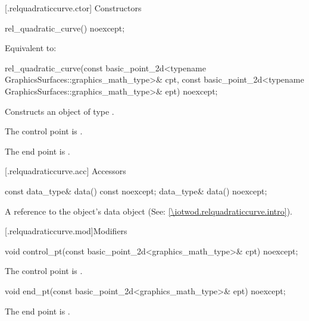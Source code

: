  [\iotwod.relquadraticcurve.ctor] {Constructors}%

%
\begin{itemdecl}
rel_quadratic_curve() noexcept;
\end{itemdecl}
\begin{itemdescr}
\pnum
\effects Equivalent to: 
\end{itemdescr}

%
\begin{itemdecl}
rel_quadratic_curve(const basic_point_2d<typename GraphicsSurfaces::graphics_math_type>& cpt,
  const basic_point_2d<typename GraphicsSurfaces::graphics_math_type>& ept) noexcept;
\end{itemdecl}
\begin{itemdescr}
\pnum
\effects Constructs an object of type .

\pnum
\remarks The control point is .

\pnum
\remarks The end point is .
\end{itemdescr}

 [\iotwod.relquadraticcurve.acc] {Accessors}%

%
\begin{itemdecl}
const data_type& data() const noexcept;
data_type& data() noexcept;
\end{itemdecl}
\begin{itemdescr}
\pnum
\returns A reference to the  object's data object (See: \ref{\iotwod.relquadraticcurve.intro}).
\end{itemdescr}

 [\iotwod.relquadraticcurve.mod]{Modifiers}%

%
\begin{itemdecl}
void control_pt(const basic_point_2d<graphics_math_type>& cpt) noexcept;
\end{itemdecl}
\begin{itemdescr}
\pnum
\effects The control point is .
\end{itemdescr}

%
\begin{itemdecl}
void end_pt(const basic_point_2d<graphics_math_type>& ept) noexcept;
\end{itemdecl}
\begin{itemdescr}
\pnum
\effects The end point is .
\end{itemdescr}

